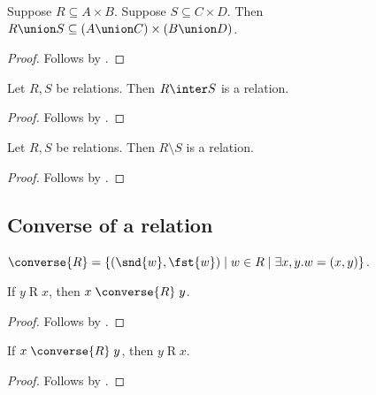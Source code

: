 \begin{proposition}\label{union_relations_is_relation_type}
    Suppose $R\subseteq A\times B$.
    Suppose $S\subseteq C\times D$.
    Then $R\union S\subseteq (A\union C)\times (B\union D)$.
\end{proposition}
\begin{proof}
    Follows by .
\end{proof}

\begin{proposition}\label{inter_relations_is_relation}
    Let $R, S$ be relations.
    Then $R\inter S$ is a relation.
\end{proposition}
\begin{proof}
    Follows by .
\end{proof}

\begin{proposition}\label{setminus_relations_is_relation}
    Let $R, S$ be relations.
    Then $R\setminus S$ is a relation.
\end{proposition}
\begin{proof}
    Follows by .
\end{proof}



\subsection{Converse of a relation}

\begin{definition}\label{converse_relation}
    $\converse{R} =
    \{ (\snd{w},\fst{w})\mid w\in R\mid \exists x, y. w = (x, y)\}$.
\end{definition}

\begin{proposition}\label{converse_intro}
    If $y\mathrel{R} x$, then $x\mathrel{\converse{R}} y$.
\end{proposition}
\begin{proof}
    Follows by .
\end{proof}

\begin{proposition}\label{converse_elim}
    If $x\mathrel{\converse{R}} y$, then $y\mathrel{R} x$.
\end{proposition}
\begin{proof}
    Follows by .
\end{proof}

